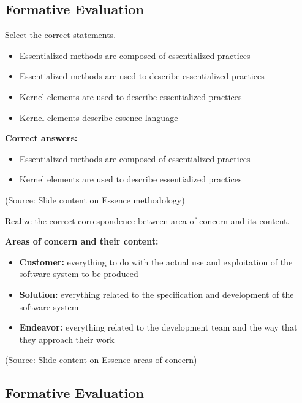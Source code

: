 \documentclass[12pt]{article}
\begin{document}
\subsection{Formative Evaluation}

\begin{questionbox}
Select the correct statements.
\end{questionbox}

\begin{itemize}
    \item[ ] Essentialized methods are composed of essentialized practices
    \item[ ] Essentialized methods are used to describe essentialized practices
    \item[ ] Kernel elements are used to describe essentialized practices
    \item[ ] Kernel elements describe essence language
\end{itemize}

\textbf{Correct answers:}
\begin{itemize}
    \item Essentialized methods are composed of essentialized practices
    \item Kernel elements are used to describe essentialized practices
\end{itemize}

(Source: Slide content on Essence methodology)

\begin{questionbox}
Realize the correct correspondence between area of concern and its content.
\end{questionbox}

\textbf{Areas of concern and their content:}

\begin{itemize}
    \item \textbf{Customer:} everything to do with the actual use and exploitation of the software system to be produced
    \item \textbf{Solution:} everything related to the specification and development of the software system
    \item \textbf{Endeavor:} everything related to the development team and the way that they approach their work
\end{itemize}

(Source: Slide content on Essence areas of concern)

\subsection{Formative Evaluation}
\end{document}
